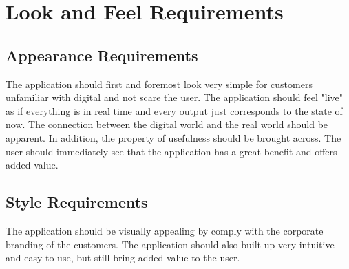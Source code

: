 \chapter{Look and Feel Requirements}
\label{chap:lookandfeel}
\section{Appearance Requirements}
The application should first and foremost look very simple for customers unfamiliar with digital and not scare the user.
The application should feel "live" as if everything is in real time and every output just corresponds to the state of now. 
The connection between the digital world and the real world should be apparent. 
In addition, the property of usefulness should be brought across. The user should immediately see that the application has a great benefit and offers added value.
\section{Style Requirements}
The application should be visually appealing by comply with the corporate branding of the customers.
The application should also built up very intuitive and easy to use, but still bring added value to the user.